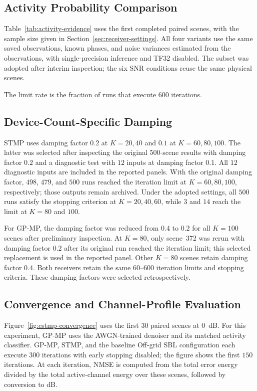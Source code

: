 \subsection{Activity Probability Comparison}
\label{app:activity-evidence-protocol}

Table~\ref{tab:activity-evidence} uses the first completed paired scenes,
with the sample size given in Section~\ref{sec:receiver-settings}.
All four variants use the same saved observations, known phases, and
noise variances estimated from the observations, with single-precision
inference and TF32 disabled.
The subset was adopted after interim inspection; the six SNR conditions
reuse the same physical scenes.

The limit rate is the fraction of runs that execute $600$ iterations.

\subsection{Device-Count-Specific Damping}

STMP uses damping factor $0.2$ at $K=20,40$ and $0.1$ at
$K=60,80,100$. The latter was selected after inspecting the original
$500$-scene results with damping factor $0.2$ and a diagnostic test with $12$ inputs at
damping factor $0.1$. All $12$ diagnostic inputs are included in the reported panels.
With the original damping factor, $498$, $479$, and $500$ runs reached the
iteration limit at $K=60,80,100$, respectively; those outputs remain
archived. Under the adopted settings, all $500$ runs satisfy the stopping criterion at
$K=20,40,60$, while $3$ and $14$ reach the limit at $K=80$ and $100$.

For GP-MP, the damping factor was reduced from $0.4$ to $0.2$ for all
$K=100$ scenes after preliminary inspection. At $K=80$, only scene~372
was rerun with damping factor $0.2$ after its original run reached the iteration
limit; this selected replacement is used in the reported panel. Other
$K=80$ scenes retain damping factor $0.4$. Both receivers retain the same
$60$--$600$ iteration limits and stopping criteria.
These damping factors were selected retrospectively.

\subsection{Convergence and Channel-Profile Evaluation}

Figure~\ref{fig:cstmp-convergence} uses the first $30$ paired scenes
at $0$~dB. For this experiment, GP-MP uses the AWGN-trained denoiser
and its matched activity classifier. GP-MP, STMP, and the baseline Off-grid SBL configuration
each execute $300$ iterations with early stopping disabled; the figure
shows the first $150$ iterations. At each iteration, NMSE is computed
from the total error energy divided by the total active-channel energy
over these scenes, followed by conversion to dB.

